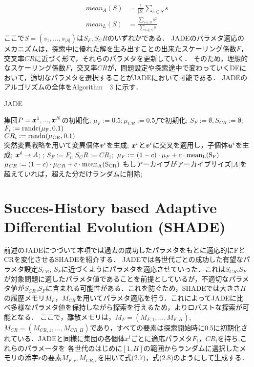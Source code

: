\documentclass[a4paper,11pt,oneside,openany]{jsbook}
\def\vector#1{\mbox{\boldmath $#1$}}
\begin{document}
\begin{eqnarray}
  mean_A(S) & = \frac{1}{|S|}\sum_{s\in S}s \\
  mean_L(S) & = \frac{\sum_{s\in S}s^2}{\sum_{s\in S}s}
\end{eqnarray}
ここで$S=(s_1,..., s_{|S|})$は$S_F,S_CR$のいずれかである．
JADEのパラメタ適応のメカニズムは，探索中に優れた解を生み出すことの出来たスケーリング係数$F$，交叉率$CR$に近づく形で，それらのパラメタを更新していく．
そのため，理想的なスケーリング係数$F$，交叉率$CR$が，問題設定や探索途中で変わっていくDEにおいて，適切なパラメタを選択することがJADEにおいて可能である．
JADEのアルゴリズムの全体をAlgorithm　3 に示す．
\newpage
\begin{algorithm}
\caption{JADE}
\label{alg:pbnf}
\begin{algorithmic}
\STATE 集団$P={\vector{x}^1,...,\vector{x}^N}$の初期化;
\STATE  $\mu_F := 0.5; \mu_{CR} := 0.5f$で初期化;
    \STATE $S_F := \emptyset, S_{CR} := \emptyset$;
        \STATE $F_i := \rm{randc}(\mu _F, 0.1)$ \\
        \STATE $CR_i := \rm{randn}(\mu _{CR}, 0.1)$ \\
        \STATE 突然変異戦略を用いて変異個体{$\vector{v}^i$}を生成;
        \STATE $\vector{x}^i$と$\vector{v}^i$に交叉を適用し，子個体$\vector{u}^i$を生成;
    \ENDFOR
        \IF {$f(\vector{u}^i) \leqq f(\vector{x}^i)$}
            \STATE $\vector{x^i} \rightarrow {A}$;
            \STATE {$\vector{x}^i:=\vector{u}^i$};
            \STATE $S_F := {F_i}, S_CR := {CR_i};$
        \ENDIF
    \ENDFOR
        \STATE $\mu_F := (1 - c)\cdot\mu _F + c\cdot \rm{mean}_L(S_F)$
        \STATE $\mu_{CR} := (1 - c)\cdot\mu _{CR} + c\cdot  \rm{mean}_A(S_{CR})$
    \ENDIF
    \STATE もしアーカイブがアーカイブサイズ$|A|$を超えていれば，超えた分だけランダムに削除;
\ENDWHILE
\end{algorithmic}
\end{algorithm}
\newpage

\section{Succes-History based Adaptive Differential Evolution (SHADE)}
前述のJADEにつづいて本項では過去の成功したパラメタをもとに適応的にFとCRを変化させるSHADEを紹介する．
JADEでは各世代ごとの成功した有望なパラメタ設定$S_{CR}$, $S_{F}$に近づくようにパラメタを適応させていった．これは$S_{CR}$,$S_F$が対象問題に適したパラメタ値であることを前提としているが，不適切なパラメタ値が$S_{CR}$,$S_F$に含まれる可能性がある．これを防ぐため，SHADEでは大きさ$H$の履歴メモリ$M_F$，$M_{CR}$を用いてパラメタ適応を行う．これによってJADEに比べ多様なパラメタ値を保持しながら探索を行えるため，よりロバストな探索が可能となる．
ここで，離散メモリは，$M_F = (M_{F,1},...,M_{F,H})$,$M_{CR}= (M_{CR,1},...,M_{CR,H})$であり，すべての要素は探索開始時に0.5に初期化されている．JADEと同様に集団の各個体\vector{x^i}ごとに適応パラメタ$F_i$，$CR_i$を持ち,これらのパラメータを
各世代のはじめに$[1,H]$の範囲からランダムに選択したメモリの添字$r$の要素$M_{F,r},M_{CR,r}$を用いて式(2.7)，式(2.8)のようにして生成する．
\end{document}
